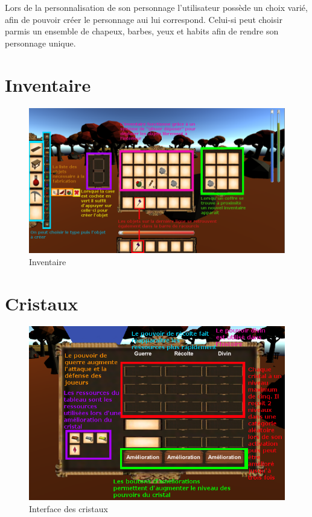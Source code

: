 \documentclass[12pt,a4paper]{article}
\begin{document}
Lors de la personnalisation de son personnage l'utilisateur possède un choix varié, afin de pouvoir créer le personnage aui lui correspond. Celui-si peut choisir parmis un ensemble de chapeux, barbes, yeux et habits afin de rendre son personnage unique.

\pagebreak

\section{Inventaire}


\begin{figure}[h!]
\includegraphics[width=15cm]{res/AideInventaire} %
\caption{Inventaire} 

\end{figure}

\pagebreak

\section{Cristaux}

\begin{figure}[h!]
\includegraphics[width=15cm]{res/AideCristal} %
\caption{Interface des cristaux} 
\end{figure}
\end{document}
